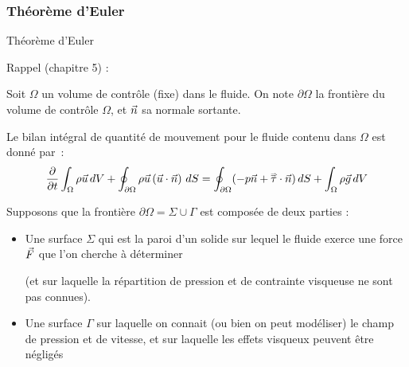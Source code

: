 \subsubsection{Théorème d'Euler}
\begin{frame}{Théorème d'Euler}

\small

Rappel  (chapitre 5) :

Soit $\Omega$ un volume de contrôle (fixe) dans le fluide. On note $\partial \Omega$ la frontière du volume de contrôle $\Omega$, et $\vec{n}$ sa normale sortante.


\pause \medskip

Le bilan intégral de quantité de mouvement pour le fluide contenu dans $\Omega$ est donné par~:
\begin{equation}
   \displaystyle \frac{\partial }{\partial t} \int_\Omega \rho \vec{u} \, dV  
   + \oint_{\partial \Omega} \rho \vec{u} \left ( \vec{u} \cdot \vec{n} \right ) \, dS
   =
    \oint_{\partial \Omega}  ( - p \vec{n} + \accentset{\Rightarrow}{\tau} \cdot \vec{n}) \, dS
   + \int_\Omega \rho \vec{g} \, dV
\end{equation}





\pause
\smallskip

Supposons que la frontière $\partial \Omega = \Sigma \cup \Gamma$ est composée de deux parties :

\begin{itemize}
\item Une surface $\Sigma$ qui est la paroi d'un solide sur lequel le fluide exerce une force 
$\vec{F}$ que l'on cherche à déterminer 

(et sur laquelle la répartition de pression et de contrainte visqueuse ne sont pas connues).

\item Une surface $\Gamma$ sur laquelle on connait (ou bien on peut modéliser) le champ de pression et de vitesse, et sur laquelle les effets visqueux peuvent être négligés
\end{itemize}


\end{frame}
